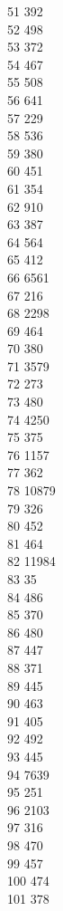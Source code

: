 { 51	392 \\
 52	498 \\
 53	372 \\
 54	467 \\
 55	508 \\
 56	641 \\
 57	229 \\
 58	536 \\
 59	380 \\
 60	451 \\
 61	354 \\
 62	910 \\
 63	387 \\
 64	564 \\
 65	412 \\
 66	6561 \\
 67	216 \\
 68	2298 \\
 69	464 \\
 70	380 \\
 71	3579 \\
 72	273 \\
 73	480 \\
 74	4250 \\
 75	375 \\
 76	1157 \\
 77	362 \\
 78	10879 \\
 79	326 \\
 80	452 \\
 81	464 \\
 82	11984 \\
 83	35 \\
 84	486 \\
 85	370 \\
 86	480 \\
 87	447 \\
 88	371 \\
 89	445 \\
 90	463 \\
 91	405 \\
 92	492 \\
 93	445 \\
 94	7639 \\
 95	251 \\
 96	2103 \\
 97	316 \\
 98	470 \\
 99	457 \\
 100	474 \\
 101	378 \\
}

